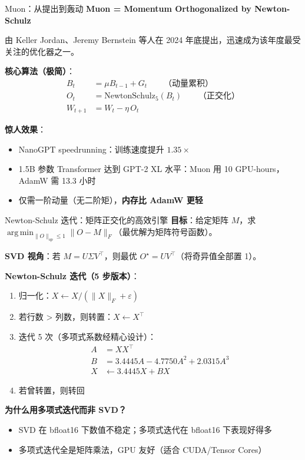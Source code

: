 \documentclass[aspectratio=169,10pt]{ctexbeamer}
\newcommand{\eps}{\varepsilon}
\DeclareMathOperator*{\argmin}{arg\,min}
\begin{document}
\begin{frame}{Muon：从提出到轰动}
\textbf{Muon = Momentum Orthogonalized by Newton-Schulz}

\vspace{0.2cm}
由 Keller Jordan、Jeremy Bernstein 等人在 2024 年底提出，迅速成为该年度最受关注的优化器之一。

\vspace{0.2cm}
\textbf{核心算法（极简）}：
\[
  \begin{aligned}
    B_t &= \mu B_{t-1} + G_t \qquad\text{（动量累积）}\\
    O_t &= \text{NewtonSchulz}_5(B_t) \qquad\text{（正交化）}\\
    W_{t+1} &= W_t - \eta\,O_t
  \end{aligned}
\]

\vspace{0.2cm}
\textbf{惊人效果}：
\begin{itemize}
  \item NanoGPT speedrunning：训练速度提升 $1.35\times$
  \item 1.5B 参数 Transformer 达到 GPT-2 XL 水平：Muon 用 10 GPU-hours，AdamW 需 13.3 小时
  \item 仅需一阶动量（无二阶矩），\textbf{内存比 AdamW 更轻}
\end{itemize}
\end{frame}

\begin{frame}{Newton-Schulz 迭代：矩阵正交化的高效引擎}
\textbf{目标}：给定矩阵 $M$，求 $\argmin_{\|O\|_{op}\le 1} \|O-M\|_F$（最优解为矩阵符号函数）。

\vspace{0.15cm}
\textbf{SVD 视角}：若 $M=U\Sigma V^\top$，则最优 $O^\star=UV^\top$（将奇异值全部置 1）。

\vspace{0.15cm}
\textbf{Newton-Schulz 迭代（5 步版本）}：
\begin{enumerate}
  \item 归一化：$X\leftarrow X/(\|X\|_F+\eps)$
  \item 若行数 > 列数，则转置：$X\leftarrow X^\top$
  \item 迭代 5 次（多项式系数经精心设计）：
  \[
    \begin{aligned}
      A &= X X^\top\\
      B &= 3.4445A - 4.7750A^2 + 2.0315A^3\\
      X &\leftarrow 3.4445X + BX
    \end{aligned}
  \]
  \item 若曾转置，则转回
\end{enumerate}

\vspace{0.15cm}
\textbf{为什么用多项式迭代而非 SVD？}
\begin{itemize}
  \item SVD 在 bfloat16 下数值不稳定；多项式迭代在 bfloat16 下表现好得多
  \item 多项式迭代全是矩阵乘法，GPU 友好（适合 CUDA/Tensor Cores）
\end{itemize}
\end{frame}
\end{document}
